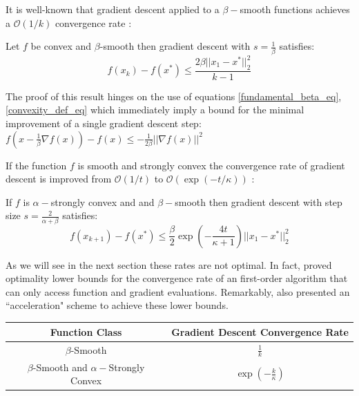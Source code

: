 It is well-known that gradient descent applied to a $\beta-$smooth functions achieves a $\mathcal{O}(1/k)$ convergence rate \cite{DBLP:journals/ftml/Bubeck15}:

\begin{theorem}
Let $f$ be convex and $\beta$-smooth then gradient descent with $s = \frac{1}{\beta}$ satisfies:
\begin{equation}
f(x_k) - f(x^*) \leq \frac{2\beta ||x_1 - x^* ||_2^2}{k-1}
\end{equation}
\end{theorem}

The proof of this result hinges on the use of equations \ref{fundamental_beta_eq}, \ref{convexity_def_eq} which immediately imply a bound for the minimal improvement of a single gradient descent step: $
f(x- \frac{1}{\beta} \nabla f(x) ) - f(x) \leq -\frac{1}{2\beta} ||\nabla f(x)||^2$

If the function $f$ is smooth and strongly convex the convergence rate of gradient descent is improved from $\mathcal{O}(1/t)$ to $\mathcal{O}(\exp(-t/\kappa))$ \cite{DBLP:journals/ftml/Bubeck15}:

\begin{theorem}
If $f$ is $\alpha-$strongly convex and and $\beta-$smooth then gradient descent with step size $s = \frac{2}{\alpha+\beta}$ satisfies:
\begin{equation}
f (x_{k+1}) - f(x^*) \leq \frac{\beta}{2} \exp(-\frac{4t}{\kappa+1}) ||x_1-x^*||_2^2
\end{equation}
\end{theorem}

As we will see in the next section these rates are not optimal. In fact, \cite{nesterov2004introductory} proved optimality lower bounds for the convergence rate of an first-order algorithm that can only access function and gradient evaluations. Remarkably, \cite{nesterov2004introductory} also presented an ``acceleration" scheme to achieve these lower bounds.

\begin{center}
 \begin{tabular}{||c c ||} 
 \hline
 Function Class  & Gradient Descent Convergence Rate \\ [0.5ex] 
 \hline\hline
 $\beta$-Smooth  & $\frac{1 }{k}$  \\ [1ex]
 \hline
 $\beta$-Smooth and $\alpha-$Strongly Convex   & $\exp\left(-\frac{k}{\kappa}\right)$  \\[1ex]
 \hline
\end{tabular}
\end{center}

